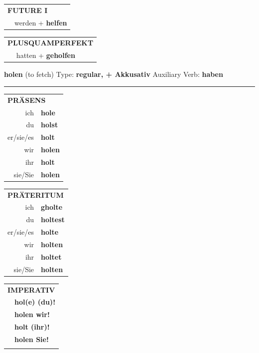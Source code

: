 \documentclass[10pt,a4paper]{revtex4-2}
\begin{document}
\begin{verbbox-dat}
\begin{tabular}{rl}
    \multicolumn{2}{l}{\textbf{FUTURE I} }\\
   & werden + \textbf{helfen}\\
 
  \end{tabular}
\hfill
   \begin{tabular}{rl}
      \multicolumn{2}{l}{\textbf{PLUSQUAMPERFEKT}}\\
   & hatten + \textbf{geholfen}\\
  \end{tabular}
  
  \vspace{-5pt}


\end{verbbox-dat}
\begin{verbbox-acc}
    {\Large \bf holen} (to fetch) \hfill Type: \textbf{regular, + Akkusativ} \hfill Auxiliary Verb: \textbf{haben} 
    
     \vspace{5pt}

    \hrule
    
    \vspace{5pt}

  \begin{tabular}{rl}
     \multicolumn{2}{l}{\textbf{PRÄSENS} }\\
    ich & \textbf{hole}\\
    du & \textbf{holst}\\
    er/sie/es & \textbf{holt}\\
    wir & \textbf{holen}\\
    ihr & \textbf{holt}\\
    sie/Sie & \textbf{holen}\\
  \end{tabular}
  \hfill
     \begin{tabular}{rl}
    \multicolumn{2}{l}{\textbf{PRÄTERITUM} }\\
    ich & \textbf{gholte}\\
    du & \textbf{holtest}\\
    er/sie/es & \textbf{holte}\\
    wir & \textbf{holten}\\
    ihr & \textbf{holtet}\\
    sie/Sie & \textbf{holten}\\
  \end{tabular}
  \hfill
  \begin{tabular}{rl}
     \multicolumn{2}{l}{\textbf{IMPERATIV} }\\
   & \textbf{hol(e) (du)!}\\
   & \textbf{holen wir!}\\
   & \textbf{holt (ihr)!}\\
   & \textbf{holen Sie!}\\
   & \vspace{10pt}
  \end{tabular}


\end{verbbox-acc}
\end{document}

